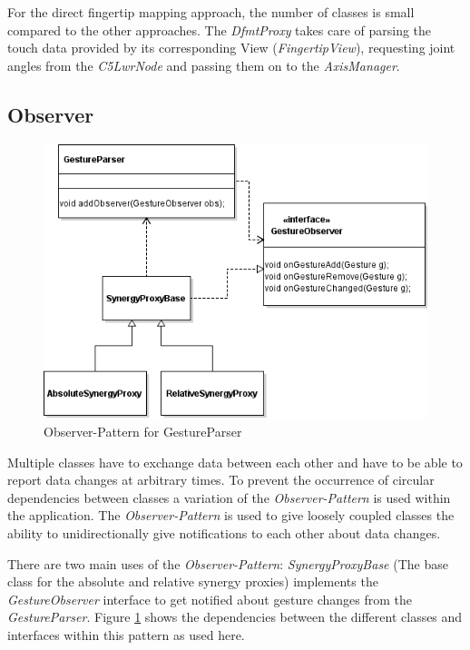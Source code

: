For the direct fingertip mapping approach, the number of classes is small compared to the other approaches. The \textit{DfmtProxy} takes care of parsing the touch data provided by its corresponding View (\textit{FingertipView}), requesting joint angles from the \textit{C5LwrNode} and passing them on to the \textit{AxisManager}.

\subsection{Observer}

\begin{figure}
	\caption{\label{fig:conc:obs1}Observer-Pattern for GestureParser}
	\includegraphics[width=\linewidth]{assets/chpt_concepts/sw/gesture_observer.png}
\end{figure}

Multiple classes have to exchange data between each other and have to be able to report data changes at arbitrary times. To prevent the occurrence of circular dependencies between classes a variation of the \textit{Observer-Pattern} is used within the application. The \textit{Observer-Pattern} is used to give loosely coupled classes the ability to unidirectionally give notifications to each other about data changes\cite{Eilebrecht2013}.

There are two main uses of the \textit{Observer-Pattern}: 
\textit{SynergyProxyBase} (The base class for the absolute and relative synergy proxies) implements the \textit{GestureObserver} interface to get notified about gesture changes from the \textit{GestureParser}. Figure \ref{fig:conc:obs1} shows the dependencies between the different classes and interfaces within this pattern as used here.

